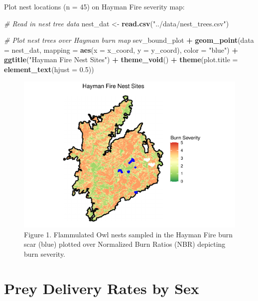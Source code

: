 \documentclass[]{article}
\newenvironment{Shaded}{\begin{snugshade}}{\end{snugshade}}
\newcommand{\CommentTok}[1]{\textcolor[rgb]{0.56,0.35,0.01}{\textit{#1}}}
\newcommand{\DataTypeTok}[1]{\textcolor[rgb]{0.13,0.29,0.53}{#1}}
\newcommand{\FloatTok}[1]{\textcolor[rgb]{0.00,0.00,0.81}{#1}}
\newcommand{\KeywordTok}[1]{\textcolor[rgb]{0.13,0.29,0.53}{\textbf{#1}}}
\newcommand{\NormalTok}[1]{#1}
\newcommand{\OperatorTok}[1]{\textcolor[rgb]{0.81,0.36,0.00}{\textbf{#1}}}
\newcommand{\StringTok}[1]{\textcolor[rgb]{0.31,0.60,0.02}{#1}}
\begin{document}
Plot nest locations (n = 45) on Hayman Fire severity map:

\begin{Shaded}
\begin{Highlighting}[]
\CommentTok{# Read in nest tree data}
\NormalTok{nest_dat <-}\StringTok{ }\KeywordTok{read.csv}\NormalTok{(}\StringTok{"../data/nest_trees.csv"}\NormalTok{)}

\CommentTok{# Plot nest trees over Hayman burn map}
\NormalTok{sev_bound_plot }\OperatorTok{+}
\StringTok{  }\KeywordTok{geom_point}\NormalTok{(}\DataTypeTok{data =}\NormalTok{ nest_dat, }\DataTypeTok{mapping =} \KeywordTok{aes}\NormalTok{(}\DataTypeTok{x =}\NormalTok{ x_coord, }\DataTypeTok{y =}\NormalTok{ y_coord), }\DataTypeTok{color =} \StringTok{"blue"}\NormalTok{) }\OperatorTok{+}
\StringTok{  }\KeywordTok{ggtitle}\NormalTok{(}\StringTok{"Hayman Fire Nest Sites"}\NormalTok{) }\OperatorTok{+}
\StringTok{  }\KeywordTok{theme_void}\NormalTok{() }\OperatorTok{+}
\StringTok{  }\KeywordTok{theme}\NormalTok{(}\DataTypeTok{plot.title =} \KeywordTok{element_text}\NormalTok{(}\DataTypeTok{hjust =} \FloatTok{0.5}\NormalTok{))}
\end{Highlighting}
\end{Shaded}

\begin{figure}
\centering
\includegraphics{../manuscript/figures/plot_severity-1.pdf}
\caption{Figure 1. Flammulated Owl nests sampled in the Hayman Fire burn
scar (blue) plotted over Normalized Burn Ratios (NBR) depicting burn
severity.}
\end{figure}

\hypertarget{prey-delivery-rates-by-sex}{%
\section{Prey Delivery Rates by Sex}\label{prey-delivery-rates-by-sex}}
\end{document}
